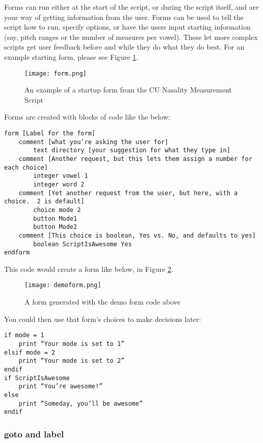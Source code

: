 Forms can run either at the start of the script, or during the script
itself, and are your way of getting information from the user. Forms can
be used to tell the script how to run, specify options, or have the
users input starting information (say, pitch ranges or the number of
measures per vowel). These let more complex scripts get user feedback
before and while they do what they do best. For an example starting
form, please see Figure \ref{form}.

\begin{figure}
  \centerline{
    \mbox{\texttt{[image: form.png]}}
  }
    \caption{An example of a startup form from the CU Nasality Measurement Script\label{form}}
  
  \end{figure}

Forms are created with blocks of code like the below:

\begin{verbatim}
form [Label for the form]
    comment [what you’re asking the user for]
        text directory [your suggestion for what they type in]
    comment [Another request, but this lets them assign a number for each choice]
        integer vowel 1
        integer word 2
    comment [Yet another request from the user, but here, with a choice.  2 is default]
        choice mode 2
        button Mode1
        button Mode2
    comment [This choice is boolean, Yes vs. No, and defaults to yes]
        boolean ScriptIsAwesome Yes
endform
\end{verbatim}

This code would create a form like below, in Figure \ref{demoform}.

\begin{figure}
  \centerline{
    \mbox{\texttt{[image: demoform.png]}}
  }
    \caption{A form generated with the demo form code above\label{demoform}}
  
  \end{figure}

You could then use that form's choices to make decisions later:

\begin{verbatim}
if mode = 1
    print “Your mode is set to 1”
elsif mode = 2
    print “Your mode is set to 2”
endif
if ScriptIsAwesome
    print “You’re awesome!”
else
    print “Someday, you’ll be awesome”
endif
\end{verbatim} 
\pagebreak

\hypertarget{goto-and-label}{%
\subsubsection{goto and label}\label{goto-and-label}}

